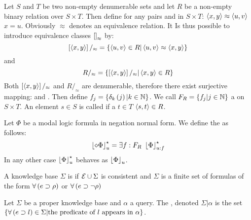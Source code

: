 \begin{defi}
Let $S$ and $T$ be two non-empty denumerable sets and let $R$ be a non-empty binary relation over $S\times T$. Then define for any pairs  and  in $S\times T$: $\left\langle x,y\right\rangle\approx\left\langle u,v\right\rangle$ \iffTx{} $x=u$. Obviously $\approx$ denotes an equivalence relation. It Is thus possible to introduce equivalence classes $\left[ \right]_{\approx}$ by:
\begin{equation}
\left[ \left\langle x,y\right\rangle\right]/_{\approx}=\left\{ \left\langle u,v\right\rangle\in R|\left\langle u,v\right\rangle\approx \left\langle x,y\right\rangle\right\}
\end{equation}
and
\begin{equation}
R/_{\approx}=\left\{ \left[ \left\langle x,y\right\rangle\right]/_{\approx}|\left\langle x,y\right\rangle\in R\right\}
\end{equation}
Both $\left[ \left\langle x,y\right\rangle\right]/_{\approx}$ and $R/_{\approx}$ are denumerable, therefore there exist surjective mapping:  and . Then define $f_j=\left\{ \delta_k\left(j\right)|k\in\mathbb{N}\right\}$. We call $F_R=\left\{ f_j|j\in\mathbb{N}\right\}$ a  on $S\times T$. An element $s\in S$ is called  if \teTx{} a $t\in T$ \stTx{} $\left\langle s,t\right\rangle\in R$.
\cite{conf/ijcai/Nonnengart93}
\end{defi}


\begin{defi}
Let $\Phi$ be a modal logic formula in negation normal form. We define the  as follows:
\begin{equation}
\floor{\diamond\Phi}_u^\star=\exists f:F_R\ \floor{\Phi}_{u:f}^\star
\end{equation}
In any other case $\left\lfloor \Phi\right\rfloor_u^\star$ behaves as $\left\lfloor \Phi\right\rfloor_u$.
\cite{conf/ijcai/Nonnengart93}
\end{defi}

\begin{defi}
A knowledge base $\Sigma$ is  if $\mathcal{E}\cup\Sigma$ is consistent and $\Sigma$ is a finite set of formulas of the form $\forall\left( e\supset\rho\right)$ or $\forall\left( e\supset\neg\rho\right)$
\cite{conf/ijcai/LiuL03}
\end{defi}

\begin{defi}
Let $\Sigma$ be a proper knowledge base and $\alpha$ a query. The , denoted $\Sigma|\alpha$ is the set $\left\{ \forall\left( e\supset l\right)\in\Sigma|\mbox{the predicate of }l\mbox{ appears in }\alpha\right\}$.
\cite{conf/ijcai/LiuL03}
\end{defi}


